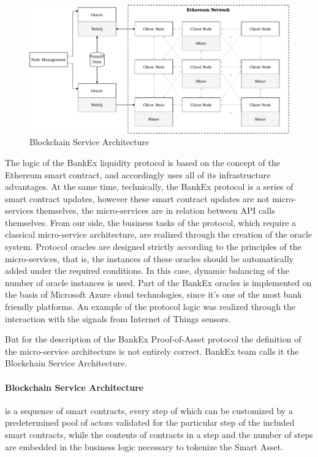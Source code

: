\documentclass{article}
\begin{document}
\begin{multicols}{2}
\begin{figure}
  \centering
  \includegraphics[width=\textwidth]{blockchain-microservice-architecture.pdf}
  \caption{Blockchain Service Architecture}
  \label{fig:blockchain-microservice-architecture}
\end{figure}

The logic of the BankEx liquidity protocol is based on the concept of the Ethereum smart contract, and accordingly uses all of its infrastructure advantages. At the same time, technically, the BankEx protocol is a series of smart contract updates, however these smart contract updates are not micro-services themselves, the micro-services are in relation between API calls themselves. From our side, the business tasks of the protocol, which require a classical micro-service architecture, are realized through the creation of the oracle system. Protocol oracles are designed strictly according to the principles of the micro-services, that is, the instances of these oracles should be automatically added under the required conditions. In this case, dynamic balancing of the number of oracle instances is used. Part of the BankEx oracles is implemented on the basis of Microsoft Azure cloud technologies, since it’s one of the most bank friendly platforms. An example of the protocol logic was realized through the interaction with the signals from Internet of Things sensors.

But for the description of the BankEx Proof-of-Asset protocol the definition of the micro-service architecture is not entirely correct. BankEx team calls it the Blockchain Service Architecture. 

\paragraph*{Blockchain Service Architecture} is a sequence of smart contracts, every step of which can be customized by a predetermined pool of actors validated for the particular step of the included smart contracts, while the contents of contracts in a step and the number of steps are embedded in the business logic necessary to tokenize the Smart Asset. 


\end{multicols}
\end{document}

